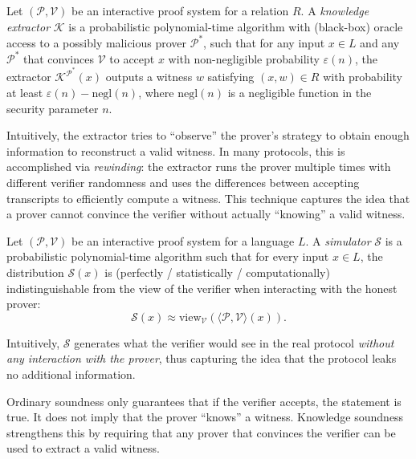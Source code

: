\begin{definition}
Let $(\mathcal{P},\mathcal{V})$ be an interactive proof system for a relation $R$.
A \emph{knowledge extractor} $\mathcal{K}$ is a probabilistic polynomial-time algorithm
with (black-box) oracle access to a possibly malicious prover $\mathcal{P}^*$,
such that for any input $x \in L$ and any $\mathcal{P}^*$ that convinces $\mathcal{V}$ to accept $x$ 
with non-negligible probability $\varepsilon(n)$, the extractor $\mathcal{K}^{\mathcal{P}^*}(x)$
outputs a witness $w$ satisfying $(x,w)\in R$ with probability at least $\varepsilon(n) - \text{negl}(n)$,
where $\text{negl}(n)$ is a negligible function in the security parameter $n$.
\end{definition}

\begin{remark}[Intuition]
Intuitively, the extractor tries to ``observe'' the prover's strategy to obtain enough information 
to reconstruct a valid witness. In many protocols, this is accomplished via \emph{rewinding}:
the extractor runs the prover multiple times with different verifier randomness and uses the
differences between accepting transcripts to efficiently compute a witness.
This technique captures the idea that a prover cannot convince the verifier without actually ``knowing'' a valid witness.
\end{remark}

\begin{definition}[Simulator]
Let $(\mathcal{P}, \mathcal{V})$ be an interactive proof system for a language $L$.
A \emph{simulator} $\mathcal{S}$ is a probabilistic polynomial-time algorithm such that
for every input $x \in L$, the distribution
$
\mathcal{S}(x)
$
is (perfectly / statistically / computationally) indistinguishable from
the view of the verifier when interacting with the honest prover:
\[
\mathcal{S}(x) \approx \mathrm{view}_{\mathcal{V}}(\langle \mathcal{P}, \mathcal{V} \rangle(x)).
\]

\noindent Intuitively, $\mathcal{S}$ generates what the verifier would see in the real protocol
\emph{without any interaction with the prover}, thus capturing the idea that the protocol leaks no additional information.
\end{definition}


\myspace

\noindent Ordinary soundness only guarantees that if the verifier accepts, the statement is true.
It does not imply that the prover ``knows'' a witness. Knowledge soundness strengthens this by
requiring that any prover that convinces the verifier can be used to extract a valid witness.


